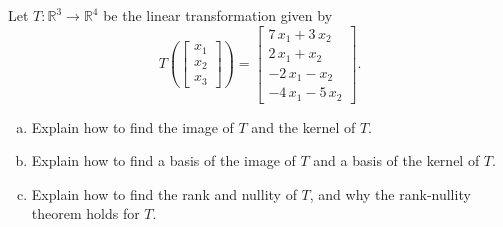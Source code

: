 
\begin{exerciseStatement}
 Let \(T:\mathbb{R}^ 3  \to \mathbb{R}^ 4 \) be the linear transformation given by \[T\left(  \left[\begin{array}{c}
x_{1} \\
x_{2} \\
x_{3}
\end{array}\right]  \right) =  \left[\begin{array}{c}
7 \, x_{1} + 3 \, x_{2} \\
2 \, x_{1} + x_{2} \\
-2 \, x_{1} - x_{2} \\
-4 \, x_{1} - 5 \, x_{2}
\end{array}\right] .\]
\begin{enumerate}[(a)]
\item Explain how to find the image of \(T\) and the kernel of \(T\).
\item Explain how to find a basis of the image of \(T\) and a basis of the kernel of \(T\).
\item Explain how to find the rank and nullity of \(T\), and why the rank-nullity theorem holds for \(T\).
\end{enumerate}
    
\end{exerciseStatement}
    
